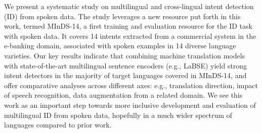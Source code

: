 We present a systematic study on multilingual and cross-lingual intent detection (ID) from spoken data. The study leverages a new resource put forth in this work, termed MInDS-14, a first training and evaluation resource for the ID task with spoken data. It covers 14 intents extracted from a commercial system in the e-banking domain, associated with spoken examples in 14 diverse language varieties. Our key results indicate that combining machine translation models with state-of-the-art multilingual sentence encoders (e.g., LaBSE) yield strong intent detectors in the majority of target languages covered in MInDS-14, and offer comparative analyses across different axes: e.g., translation direction, impact of speech recognition, data augmentation from a related domain. We see this work as an important step towards more inclusive development and evaluation of multilingual ID from spoken data, hopefully in a much wider spectrum of languages compared to prior work.

